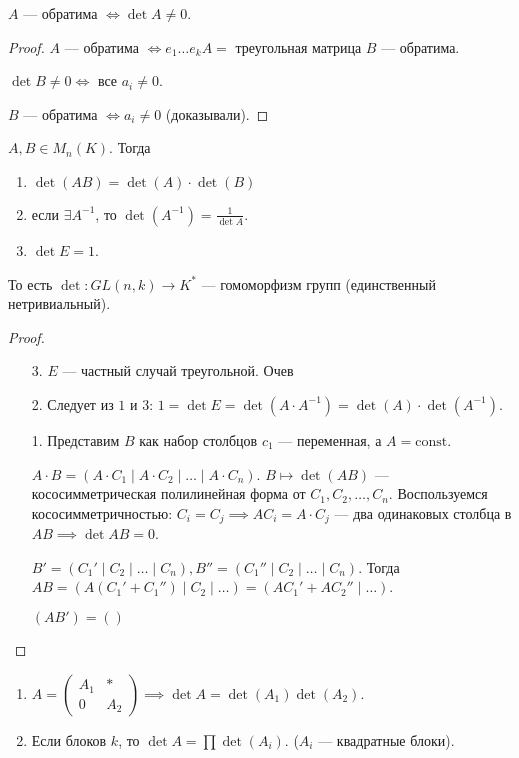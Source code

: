 \begin{theorem}
    $A$ --- обратима  $\iff \det A \neq 0$.
\end{theorem}
\begin{proof}
    $A$ --- обратима  $\iff e_1\ldots e_kA =$ треугольная матрица $B$ --- обратима.

    $\det B \neq 0 \iff $ все $a_i \neq 0$.

     $B$ --- обратима  $\iff a_i \neq 0$ (доказывали).
\end{proof}
\begin{theorem}
    $A, B \in M_n(K)$. Тогда 
     \begin{enumerate}
         \item $\det(AB) = \det(A) \cdot \det(B)$
         \item если  $\exists A^{-1}$, то  $\det(A^{-1}) = \frac{1}{\det A}$.
         \item $\det E = 1$.
    \end{enumerate}
    То есть $\det\!: GL(n, k) \to K^*$ --- гомоморфизм групп (единственный нетривиальный).
\end{theorem}
\begin{proof}
    \begin{enumerate}
        \item[3.] $E$ --- частный случай треугольной. Очев
        \item[2.] Следует из $1$ и 3:  $1 = \det E = \det(A \cdot A^{-1}) = \det(A) \cdot \det(A^{-1})$.
        \item[1.] Представим  $B$ как набор столбцов $c_1$ --- переменная, а $A = \text{const}$.

             $A \cdot B = \left(A \cdot C_1 \mid A \cdot C_2 \mid \ldots \mid A \cdot C_n\right)$. $B \mapsto \det(AB)$ --- кососимметрическая полилинейная форма от  $C_1, C_2, \ldots, C_n$. Воспользуемся кососимметричностью: $C_i = C_j \implies A C_i = A\cdot C_j$ --- два одинаковых столбца в  $AB \implies \det AB = 0$.

              $B' = (C_1' \mid C_2 \mid \ldots \mid C_n), B'' = (C_1'' \mid C_2 \mid \ldots \mid C_n)$. Тогда $AB=(A(C_1' + C_1'') \mid C_2 \mid \ldots) = (AC_1' + AC_2'' \mid \ldots)$.

              $(AB') = ()$
    \end{enumerate}
\end{proof}
\begin{theorem}
    \begin{enumerate}
        \item $A = \left( \begin{array}{c|c} A_1 & \ast\\ \hline 0 & A_2\end{array}\right) \implies \det A = \det(A_1)\det(A_2)$.
        \item Если блоков  $k$, то  $\det A = \prod \det(A_i)$. ($A_i$ --- квадратные блоки).
    \end{enumerate}
\end{theorem}
